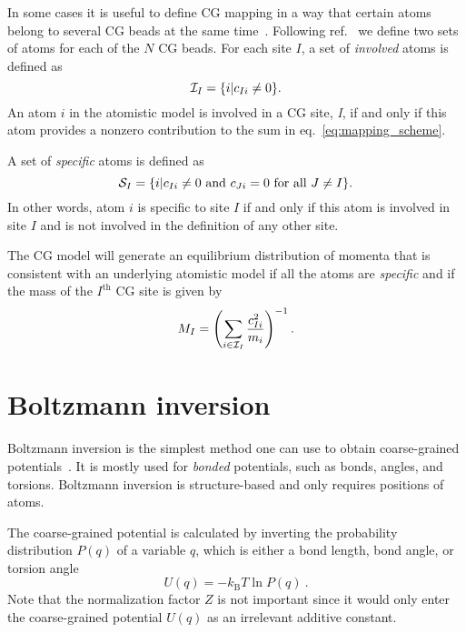 In some cases it is useful to define CG mapping in a way that certain atoms belong to several CG beads at the same time~\cite{Fritz:2009}. Following ref.~\cite{Noid:2008.1} we define two sets of atoms for each of the $N$ CG beads. For each site $I$, a set of {\em involved} atoms is defined as
\begin{equation}
 {\cal I}_I=\{i|c_{Ii}\ne0\}.
\end{equation}
An atom $i$ in the atomistic model is involved in a CG site, \textit{I}, if and only if this atom provides a nonzero contribution to the sum in eq.~\ref{eq:mapping_scheme}.

A set of {\em specific} atoms is defined as
\begin{equation}
 {\cal S}_I=\{i|c_{Ii}\ne0 \text{ and } c_{Ji}=0 \text{ for all } J \ne I\}.
\end{equation}
In other words, atom $i$ is specific to site $I$ if and only if this atom is involved in site $I$ and is not involved in the definition of any other site.

The CG model will generate an equilibrium distribution of momenta that is consistent with an underlying atomistic model if all the atoms are {\em specific} and if the mass of the $I^\text{th}$ CG site is given by~\cite{Noid:2008.1}
\begin{equation}
M_I= \left( \sum_{i \in {\cal I}_I}\frac{c_{Ii}^2}{m_i} \right)^{-1}.
\end{equation}

\section{Boltzmann inversion}
\label{sec:bi}

Boltzmann inversion is the simplest method one can use to obtain coarse-grained potentials~\cite{Tschoep:1998}. It is mostly used for {\em bonded} potentials, such as bonds, angles, and torsions. Boltzmann inversion is structure-based and only requires positions of atoms.

The coarse-grained potential is calculated by inverting the probability distribution $P(q)$ of a variable $q$, which is either a bond length, bond angle, or torsion angle
\begin{equation}
  U(q) = - k_\text{B} T \ln  P(q) ~.
  \label{eq:inv_boltzmann}
\end{equation}
%
Note that the normalization factor $Z$ is not important since it would only enter the coarse-grained potential $U(q)$ as an irrelevant additive constant.

